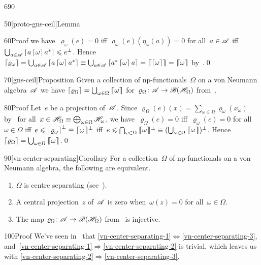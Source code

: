 \begin{parsec}{690}
\begin{point}{50}[proto-gns-ceil]{Lemma}
\begin{point}{60}{Proof}
we have~$\varrho_\omega(e)=0$
iff $\varrho_\omega(e)(\eta_\omega(a))=0$ for all~$a\in\mathscr{A}$
iff $\bigcup_{a\in\mathscr{A}} \left\lceil a\left\lceil\omega\right\rceil a^*\right\rceil\leqslant e^\perp$.
Hence $\ceil{\varrho_\omega}=
\bigcup_{a\in\scrA}
\ceil{a\ceil{\omega}a^*} \equiv
\bigcup_{a\in\scrA}
\ceil{a^*\ceil{\omega}a}
=\cceil{\ceil{\omega}}
=\cceil{\omega}$
by~.\qed
\end{point}
\end{point}
\begin{point}{70}[gns-ceil]{Proposition}%
Given a collection of np-functionals~$\Omega$
on a von Neumann algebra~$\mathscr{A}$
we have $\left\lceil\varrho_\Omega\right\rceil
=\bigcup_{\omega\in\Omega} \left\lceil\!\!\left\lceil\omega\right\rceil\!\!\right\rceil$
for~$\varrho_\Omega\colon \mathscr{A}\to\mathscr{B}(\mathscr{H}_\Omega)$
from~.
\begin{point}{80}{Proof}%
Let~$e$ be a projection of~$\mathscr{A}$.
Since
$\varrho_\Omega(e)(x)
= \sum_{\omega\in\Omega} \varrho_\omega(x_\omega)$
by~
for all~$x\in\mathscr{H}_\Omega\equiv\bigoplus_{\omega\in\Omega}\mathscr{H}_\omega$,
we have~$\varrho_\Omega(e)=0$
iff~$\varrho_\omega(e)=0$ for all~$\omega\in\Omega$
iff~$e\leqslant \smash{\left\lceil\varrho_\omega\right\rceil^\perp \equiv 
\smash{\left\lceil\!\!\left\lceil\omega\right\rceil\!\!\right\rceil}^\perp}$
iff~$e\leq \bigcap_{\omega\in\Omega}\smash{\cceil{\omega}}^\perp 
\equiv (\bigcup_{\omega\in\Omega} \cceil{\omega})^\perp$.
Hence~$\left\lceil\varrho_\Omega\right\rceil=\bigcup_{\omega\in\Omega}\left\lceil\!\!\left\lceil\omega\right\rceil\!\!\right\rceil$.\qed
\end{point}
\end{point}
\begin{point}{90}[vn-center-separating]{Corollary}%
For a collection~$\Omega$ of np-functionals
on a von Neumann algebra,
the following are equivalent.
\begin{enumerate}
\item
\label{vn-center-separating-1}
$\Omega$ is centre separating (see~).
\item
\label{vn-center-separating-2}
A central projection~$z$ of~$\mathscr{A}$ is zero
when~$\omega(z)=0$ for all~$\omega\in\Omega$.
\item
\label{vn-center-separating-3}
The map $\varrho_\Omega\colon\mathscr{A}\to\mathscr{B}(\mathscr{H}_\Omega)$
from~ 
is injective.
\end{enumerate}
\spacingfix%
\begin{point}{100}{Proof}%
We've seen in~
that
\ref{vn-center-separating-1}$\iff$\ref{vn-center-separating-3},
and~\ref{vn-center-separating-1}$\Rightarrow$\ref{vn-center-separating-2}
is trivial,
which leaves us with 
\ref{vn-center-separating-2}$\Rightarrow$\ref{vn-center-separating-3}.

\end{point}
\end{point}
\end{parsec}
